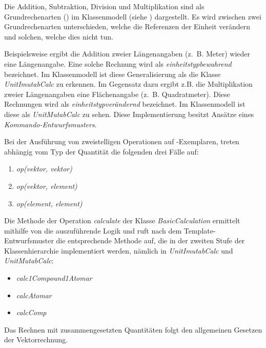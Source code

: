 \label{Berechnungen}


Die Addition, Subtraktion, Division und Multiplikation sind als Grundrechenarten () im Klassenmodell (siehe ) dargestellt. 
Es wird zwischen zwei Grundrechenarten unterschieden, welche die Referenzen der Einheit verändern und solchen, welche dies nicht tun. 

Beispielsweise ergibt die Addition zweier Längenangaben (z.~B. Meter) wieder eine Längenangabe. 
Eine solche Rechnung wird als \emph{einheitstypbewahrend} bezeichnet. Im Klassenmodell ist diese Generalisierung als die Klasse \textit{UnitImutabCalc} zu erkennen. 
Im Gegensatz dazu ergibt z.B. die Multiplikation zweier Längenangaben eine Flächenangabe (z.~B. Quadratmeter). 
Diese Rechnungen wird als \emph{einheitstypverändernd} bezeichnet. Im Klassenmodell ist diese als \textit{UnitMutabCalc} zu sehen. 
Diese Implementierung besitzt Ansätze eines \emph{Kommando-Entwurfsmusters}.

\newpage
{}

Bei der Ausführung von zweistelligen Operationen auf -Exemplaren, 
treten abhängig vom Typ der Quantität die folgenden drei Fälle auf:
\begin{enumerate}
\item \textit{op(vektor, vektor)}
\item \textit{op(vektor, element)}
\item \textit{op(element, element)}
\end{enumerate}

Die Methode der Operation \textit{calculate} der Klasse \textit{BasicCalculation} ermittelt mithilfe von  die auszuführende Logik und ruft nach dem Template-Entwurfsmuster die entsprechende Methode auf, die in der zweiten Stufe der Klassenhierarchie implementiert werden, nämlich in \textit{UnitImutabCalc} und \textit{UnitMutabCalc}:
\begin{itemize}
\item \textit{calc1Compound1Atomar}
\item \textit{calcAtomar}
\item \textit{calcComp}
\end{itemize}

Das Rechnen mit zusammengesetzten Quantitäten folgt den allgemeinen Gesetzen der Vektorrechnung.

